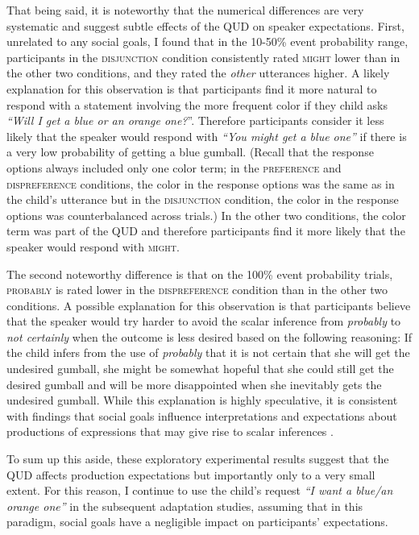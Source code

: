 That being said, it is noteworthy that the numerical differences are very systematic and suggest subtle effects of the QUD on speaker expectations. First,
unrelated to any social goals, I found that in the 10-50\% event probability range, participants in the \textsc{disjunction} condition consistently rated \textsc{might}
 lower than in the other two conditions, and they rated the \emph{other} utterances higher. A likely explanation for this observation is that participants find it more natural to respond with a statement
involving the more frequent color if they child asks \emph{``Will I get a blue or an orange one?}''.  Therefore participants consider  it less likely that the speaker
would respond with \emph{``You might get a blue one''} if there is a very low probability of getting a blue gumball. (Recall that the response options always included
only one color term; in the \textsc{preference} and \textsc{dispreference} conditions, the color in the response options was the same as in the child's 
utterance but in the \textsc{disjunction} condition, the color in the response options was counterbalanced across trials.) In the other two conditions, the color term
was part of the QUD and therefore participants find it more likely that the speaker would respond with \textsc{might}.

The second noteworthy difference is that on the 100\% event probability trials, \textsc{probably} is rated lower in the \textsc{dispreference} condition
than in the other two conditions. A possible explanation for this observation is that participants believe that the speaker would try harder to avoid 
the scalar inference from \textit{probably} to \textit{not certainly} when the outcome is less desired based on the following reasoning:
 If the child infers from the use of \textit{probably} that it is not certain that she will get the undesired gumball, she might be somewhat hopeful
 that she could still get the desired gumball and will be more disappointed when she inevitably gets the undesired gumball. While this explanation
 is highly speculative, it is consistent with findings that social goals influence interpretations and expectations about productions of expressions
 that may give rise to scalar inferences \cite{Bonnefon, Yoon2019}.
 
 To sum up this aside, these exploratory experimental results suggest that the QUD affects production expectations but importantly only to a very small
 extent. For this reason, I continue to use the child's request \emph{``I want a blue/an orange one''} in the subsequent adaptation studies, assuming that
 in this paradigm, social goals have a negligible impact on participants' expectations.


